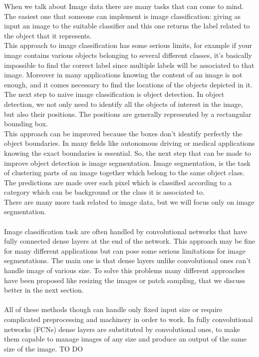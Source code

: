 \documentclass[10pt,twocolumn,letterpaper]{article}
\begin{document}
When we talk about Image data there are many tasks that can come to mind. The easiest one that someone can implement is image classification: giving as input an image to the suitable classifier and this one returns the label related to the object that it represents. \\
This approach to image classification has some serious limits, for example if your image contains various objects belonging to several different classes, it's basically impossible to find the correct label since multiple labels will be associated to that image. Moreover in many applications knowing the content of an image is not enough, and it comes necessary to find the locations of the objects depicted in it. \\
The next step to naive image classification is object detection. In object detection, we not only need to identify all the objects of interest in the image, but also their positions. The positions are generally represented by a rectangular bounding box. \\
This approach can be improved because the boxes don't identify perfectly the object boundaries. In many fields like autonomous driving or medical applications knowing the exact boundaries is essential.
So, the next step that can be made to improve object detection is image segmentation.
Image segmentation, is the task of clustering parts of an image together which belong to the same object class. The predictions are made over each pixel which is classified according to a category which can be background or the class it is associated to. \\
There are many more task related to image data, but we will focus only on image segmentation. \\ \\
Image classification task are often handled by convolutional networks that have fully connected dense layers at the end of the network. This approach may be fine for many different applications but can pose some serious limitations for image segmentations. The main one is that dense layers unlike convolutional ones can't handle image of various size. To solve this problems many different approaches have been proposed like resizing the images or patch sampling, that we discuss better in the next section. \\ \\
All of these methods though can handle only fixed input size or require complicated preprocessing and machinery in order to work. In fully convolutional networks (FCNs) dense layers are substituted by convolutional ones, to make them capable to manage images of any size and produce an output of the same size of the image. TO DO
\end{document}
